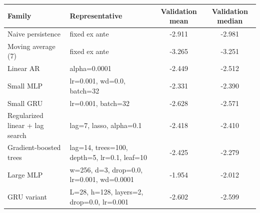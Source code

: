 \begin{tabularx}{\textwidth}{@{}l >{\raggedright\arraybackslash}X c c@{}}
\toprule
Family & Representative & Validation mean & Validation median \\
\midrule
Naive persistence & fixed ex ante & -2.911 & -2.981 \\
Moving average (7) & fixed ex ante & -3.265 & -3.251 \\
Linear AR & alpha=0.0001 & -2.449 & -2.512 \\
Small MLP & lr=0.001, wd=0.0, batch=32 & -2.331 & -2.390 \\
Small GRU & lr=0.001, batch=32 & -2.628 & -2.571 \\
Regularized linear + lag search & lag=7, lasso, alpha=0.1 & -2.418 & -2.410 \\
Gradient-boosted trees & lag=14, trees=100, depth=5, lr=0.1, leaf=10 & -2.425 & -2.279 \\
Large MLP & w=256, d=3, drop=0.0, lr=0.001, wd=0.0001 & -1.954 & -2.012 \\
GRU variant & L=28, h=128, layers=2, drop=0.0, lr=0.001 & -2.602 & -2.599 \\
\bottomrule
\end{tabularx}
